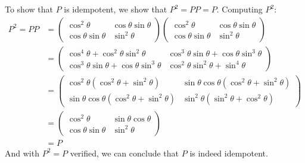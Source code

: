 \documentclass[10pt]{article}
\begin{document}
\begin{enumerate}[label=\alph*)]
			\begin{solution}
				To show that $P$ is idempotent, we show that $P^2 = PP = P$. Computing $P^2$:
				\begin{align*}
					P^2 = P P &= \begin{pmatrix} \cos^2 \theta & \cos \theta \sin \theta \\ \cos \theta \sin \theta & \sin^2 \theta  \end{pmatrix}  \begin{pmatrix} \cos^2 \theta & \cos \theta \sin \theta \\ \cos \theta \sin \theta & \sin^2 \theta  \end{pmatrix} \\
							  &= \begin{pmatrix} \cos^4 \theta + \cos^2 \theta \sin^2 \theta &
							  \cos^3 \theta \sin \theta + \cos \theta \sin^3 \theta \\
						  \cos^3 \theta \sin \theta + \cos \theta \sin^3 \theta &
					  \cos^2 \theta \sin^2 \theta + \sin^4 \theta\end{pmatrix}  \\
							  &= \begin{pmatrix} \cos^2 \theta (\cos^2 \theta + \sin^2 \theta) & 
							  \sin \theta \cos \theta(\cos^2 \theta + \sin^2 \theta) \\
							  \sin \theta \cos \theta  (\cos^2 \theta + \sin^2 \theta)&
							  \sin^2 \theta(\sin^2 \theta + \cos^2 \theta)  \end{pmatrix}  \\
							&= \begin{pmatrix} \cos^2 \theta & \sin \theta \cos \theta\\
							\cos \theta \sin \theta & \sin^2 \theta \end{pmatrix}\\
							&= P
				\end{align*}
				And with $P^2 = P$ verified, we can conclude that $P$ is indeed idempotent. 
			\end{solution}
	\end{enumerate}
\end{document}
